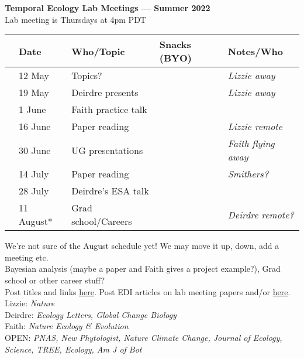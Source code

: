 \documentclass[11pt]{article}
\begin{document}
 
\raggedright
{}

\begin{center} 
{\large \textbf{Temporal Ecology Lab Meetings --- Summer 2022}} \\ [2pt]
Lab meeting is Thursdays at 4pm PDT\\ %
\end{center} 

\begin{center}
\begin{tabular}{ p{0.2 cm}  p{2 cm}  p{4.5 cm}  p{3 cm}  p{3.5 cm} }  \hline \hline
 & \textbf{Date}
   & \textbf{Who/Topic}
      & \textbf{Snacks (BYO)} 
         & \textbf{Notes/Who} \\ 
\hline \hline
 &12 May & Topics?  &       & \emph{Lizzie away} \\\hline
 & 19 May & Deirdre presents & & \emph{Lizzie away} \\\hline
 & 1 June &  Faith practice talk &  & \\\hline  
 & 16 June &    Paper reading &  & \emph{Lizzie remote}  \\\hline
 & 30 June  & UG presentations   & &  \emph{Faith flying away} \\\hline 
 & 14 July &   Paper reading  & & \emph{Smithers?}     \\\hline
 & 28 July  &   Deirdre's ESA talk  & & \\\hline
 & 11 August* &    Grad school/Careers & &\emph{Deirdre remote?}    \\\hline 
\hline
\end{tabular}
\end{center}
\noindent * We're not sure of the August schedule yet! We may move it up, down, add a meeting etc. \\
\vspace{6pt}
 Bayesian analysis (maybe a paper and Faith gives a project example?), Grad school or other career stuff?\\
\vspace{7pt}
 Post titles and links \href{https://docs.google.com/document/d/1j0WdDbjdp8ERLSO7whvtnP-tOblYMlX33TSCXy_uRKo/edit?usp=sharing}{\underline{here}}. Post EDI articles on lab meeting papers and/or  \href{https://docs.google.com/document/d/18VbP-03oD0BsArxYm60g1ZvvFL7IoA3-6rpdHb1eLPw/edit#heading=h.gsqcglkhxkzg}{here}.\\
Lizzie: \emph{Nature}\\
Deirdre: \emph{Ecology Letters, Global Change Biology}\\
Faith: \emph{Nature Ecology \& Evolution}\\
OPEN: \emph{PNAS, New Phytologist, Nature Climate Change, Journal of Ecology, Science, TREE, Ecology, Am J of Bot}\\
\end{document}
